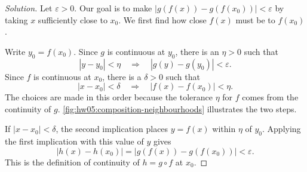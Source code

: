 \begin{proof}[Solution]
  Let $\varepsilon>0$. Our goal is to make
  $|g(f(x))-g(f(x_0))|<\varepsilon$ by taking $x$ sufficiently close
  to $x_0$. We first find how close $f(x)$ must be to $f(x_0)$.

  Write $y_0=f(x_0)$. Since $g$ is continuous at $y_0$, there is an
  $\eta>0$ such that
  \[
    |y-y_0|<\eta
      \quad\Longrightarrow\quad |g(y)-g(y_0)|<\varepsilon.
  \]
  Since $f$ is continuous at $x_0$, there is a $\delta>0$ such that
  \[
    |x-x_0|<\delta
      \quad\Longrightarrow\quad |f(x)-f(x_0)|<\eta.
  \]
  The choices are made in this order because the tolerance $\eta$ for
  $f$ comes from the continuity of $g$.
  \autoref{fig:hw05:composition-neighbourhoods} illustrates the two steps.

  \begin{marginfigure}
    \centering
    
    \caption[Neighbourhoods for a composition.]{%
      Schematic neighbourhoods for a composition.
      First choose $\eta$ to reach the required output tolerance $\varepsilon$.
      Then choose $\delta$ to reach that intermediate tolerance $\eta$.
      The arrows show the order in which inputs pass through the maps.}
    \label{fig:hw05:composition-neighbourhoods}
  \end{marginfigure}

  If $|x-x_0|<\delta$, the second implication places $y=f(x)$ within
  $\eta$ of $y_0$. Applying the first implication with this value of $y$
  gives
  \[
    |h(x)-h(x_0)|
      =|g(f(x))-g(f(x_0))|<\varepsilon.
  \]
  This is the definition of continuity of $h=g\circ f$ at $x_0$.
\end{proof}
